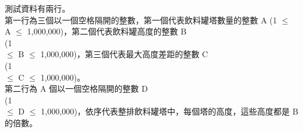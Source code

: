 測試資料有兩行。\\
第一行為三個以一個空格隔開的整數，第一個代表飲料罐塔數量的整數 A (1 $\leq$ A $\leq$ 1,000,000)，第二個代表飲料罐高度的整數 B\\
(1\\
$\leq$ B $\leq$ 1,000,000)，第三個代表最大高度差距的整數 C\\
(1\\
$\leq$ C $\leq$ 1,000,000)。\\
第二行為 A 個以一個空格隔開的整數 D\\
(1\\
$\leq$ D $\leq$ 1,000,000)，依序代表整排飲料罐塔中，每個塔的高度，這些高度都是 B 的倍數。\\
